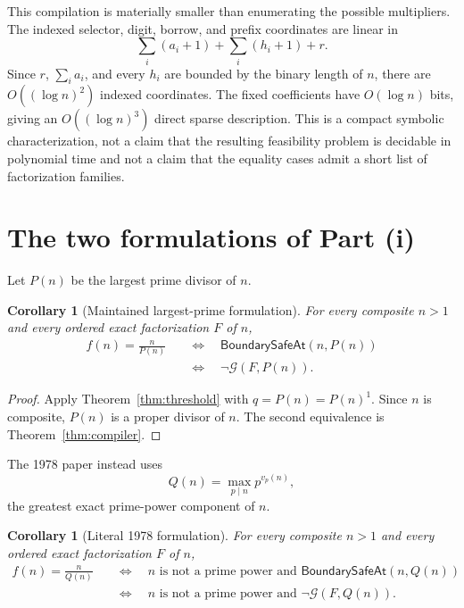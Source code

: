 \documentclass[11pt]{article}
\newtheorem{corollary}[theorem]{Corollary}
\theoremstyle{remark}
\newcommand{\BoundarySafeAt}{\mathsf{BoundarySafeAt}}
\newcommand{\GSys}{\mathcal G}
\begin{document}
This compilation is materially smaller than enumerating the possible
multipliers.  The indexed selector, digit, borrow, and prefix coordinates are
linear in
\[
 \sum_i(a_i+1)+\sum_i(h_i+1)+r.
\]
Since $r$, $\sum_i a_i$, and every $h_i$ are bounded by the binary length of
$n$, there are $O((\log n)^2)$ indexed coordinates.  The fixed coefficients
have $O(\log n)$ bits, giving an $O((\log n)^3)$ direct sparse description.
This is a compact symbolic characterization, not a claim that the resulting
feasibility problem is decidable in polynomial time and not a claim that the
equality cases admit a short list of factorization families.

\section{The two formulations of Part (i)}

Let $P(n)$ be the largest prime divisor of $n$.

\begin{corollary}[Maintained largest-prime formulation]
For every composite $n>1$ and every ordered exact factorization $F$ of $n$,
\[
 \begin{aligned}
 f(n)=\frac{n}{P(n)}
 &\quad\Longleftrightarrow\quad \BoundarySafeAt(n,P(n))\\
 &\quad\Longleftrightarrow\quad \neg\GSys(F,P(n)).
 \end{aligned}
\]
\end{corollary}

\begin{proof}
Apply Theorem~\ref{thm:threshold} with $q=P(n)=P(n)^1$.  Since $n$ is
composite, $P(n)$ is a proper divisor of $n$.  The second equivalence is
Theorem~\ref{thm:compiler}.
\end{proof}

The 1978 paper instead uses
\[
 Q(n)=\max_{p\mid n}p^{v_p(n)},                            \tag{17}
\]
the greatest exact prime-power component of $n$.

\begin{corollary}[Literal 1978 formulation]
For every composite $n>1$ and every ordered exact factorization $F$ of $n$,
\[
 \begin{aligned}
 f(n)=\frac{n}{Q(n)}
 &\quad\Longleftrightarrow\quad
 n\text{ is not a prime power and }\BoundarySafeAt(n,Q(n))\\
 &\quad\Longleftrightarrow\quad
 n\text{ is not a prime power and }\neg\GSys(F,Q(n)).
 \end{aligned}
\]
\end{corollary}
\end{document}
